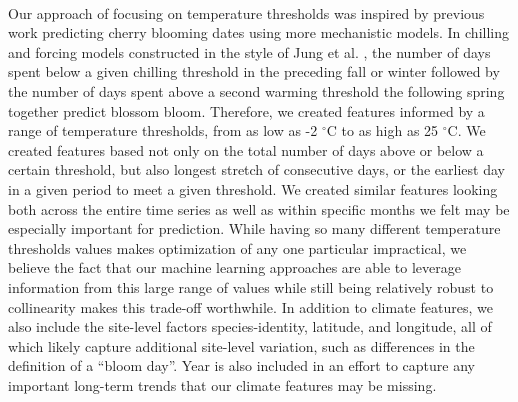 \documentclass[a4paper,11pt]{article}
\begin{document}
\paragraph*{}
Our approach of focusing on temperature thresholds was inspired by previous work predicting cherry blooming dates using more mechanistic models. In chilling and forcing models constructed in the style of Jung et al. \cite{jung2005predicting}, the number of days spent below a given chilling threshold in the preceding fall or winter followed by the number of days spent above a second warming threshold the following spring together predict blossom bloom.  Therefore, we created features informed by a range of temperature thresholds, from as low as -2 $^{\circ}$C to as high as 25 $^{\circ}$C. We created features based not only on the total number of days above or below a certain threshold, but also longest stretch of consecutive days, or the earliest day in a given period to meet a given threshold. We created similar features looking both across the entire time series as well as within specific months we felt may be especially important for prediction. While having so many different temperature thresholds values makes optimization of any one particular impractical, we believe the fact that our machine learning approaches are able to leverage information from this large range of values while still being relatively robust to collinearity makes this trade-off worthwhile. In addition to climate features, we also include the site-level factors species-identity, latitude, and longitude, all of which likely capture additional site-level variation, such as differences in the definition of a ``bloom day''. Year is also included in an effort to capture any important long-term trends that our climate features may be missing. 
\end{document}
